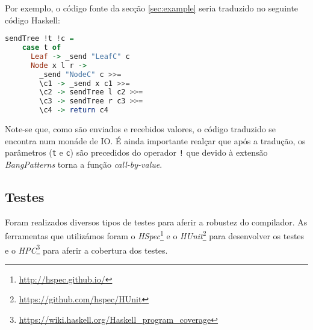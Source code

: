\begin{itemize}
Por exemplo, o código fonte da secção \ref{sec:example} seria traduzido no seguinte código Haskell:


\begin{lstlisting}[language=Haskell, style=eclipse-Haskell]
  sendTree !t !c =
    case t of 
      Leaf -> _send "LeafC" c 
      Node x l r ->
        _send "NodeC" c >>=
        \c1 -> _send x c1 >>=
        \c2 -> sendTree l c2 >>=
        \c3 -> sendTree r c3 >>=
        \c4 -> return c4 
\end{lstlisting}

Note-se que, como são enviados e recebidos valores, o código traduzido se encontra num monáde de IO. É ainda importante realçar que após a tradução, os parâmetros (\lstinline|t| e \lstinline|c|) são precedidos do operador \lstinline|!| que devido à extensão \textit{BangPatterns} torna a função \textit{call-by-value}.

\end{itemize}

\subsection{Testes}

Foram realizados diversos tipos de testes para aferir a robustez do compilador. As ferramentas que utilizámos foram o \textit{HSpec}\footnote{\url{http://hspec.github.io/}} e o \textit{HUnit}\footnote{\url{https://github.com/hspec/HUnit}} para desenvolver os testes e o \textit{HPC}\footnote{\url{https://wiki.haskell.org/Haskell_program_coverage}} para aferir a cobertura dos testes.

